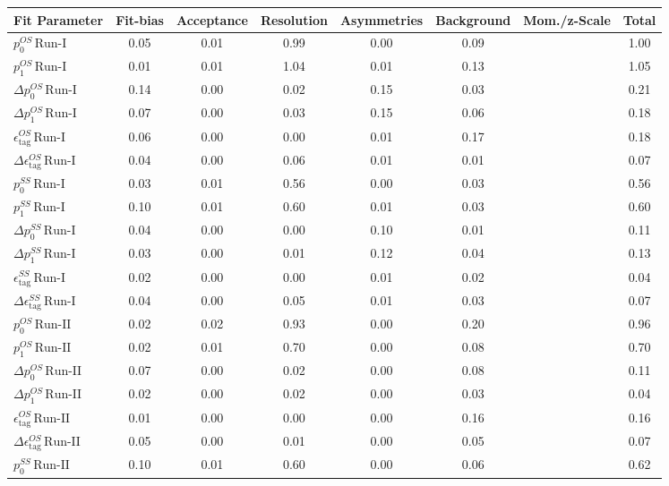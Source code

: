 \begin{tabular}{l  c  c  c  c  c  c  | c }
\hline
\hline
Fit Parameter & Fit-bias & Acceptance & Resolution & Asymmetries & Background & Mom./z-Scale &  Total  \\ 
\hline
$p_{0}^{OS} \, \text{Run-I}$ & 0.05 & 0.01 & 0.99 & 0.00 & 0.09 &  & 1.00 \\ 
$p_{1}^{OS} \, \text{Run-I}$ & 0.01 & 0.01 & 1.04 & 0.01 & 0.13 &  & 1.05 \\ 
$\Delta p_{0}^{OS} \, \text{Run-I}$ & 0.14 & 0.00 & 0.02 & 0.15 & 0.03 &  & 0.21 \\ 
$\Delta p_{1}^{OS} \, \text{Run-I}$ & 0.07 & 0.00 & 0.03 & 0.15 & 0.06 &  & 0.18 \\ 
$\epsilon_{\text{tag}}^{OS} \, \text{Run-I}$ & 0.06 & 0.00 & 0.00 & 0.01 & 0.17 &  & 0.18 \\ 
$\Delta \epsilon_{\text{tag}}^{OS} \, \text{Run-I}$ & 0.04 & 0.00 & 0.06 & 0.01 & 0.01 &  & 0.07 \\ 
$p_{0}^{SS} \, \text{Run-I}$ & 0.03 & 0.01 & 0.56 & 0.00 & 0.03 &  & 0.56 \\ 
$p_{1}^{SS} \, \text{Run-I}$ & 0.10 & 0.01 & 0.60 & 0.01 & 0.03 &  & 0.60 \\ 
$\Delta p_{0}^{SS} \, \text{Run-I}$ & 0.04 & 0.00 & 0.00 & 0.10 & 0.01 &  & 0.11 \\ 
$\Delta p_{1}^{SS} \, \text{Run-I}$ & 0.03 & 0.00 & 0.01 & 0.12 & 0.04 &  & 0.13 \\ 
$\epsilon_{\text{tag}}^{SS} \, \text{Run-I}$ & 0.02 & 0.00 & 0.00 & 0.01 & 0.02 &  & 0.04 \\ 
$\Delta \epsilon_{\text{tag}}^{SS} \, \text{Run-I}$ & 0.04 & 0.00 & 0.05 & 0.01 & 0.03 &  & 0.07 \\ 
$p_{0}^{OS} \, \text{Run-II}$ & 0.02 & 0.02 & 0.93 & 0.00 & 0.20 &  & 0.96 \\ 
$p_{1}^{OS} \, \text{Run-II}$ & 0.02 & 0.01 & 0.70 & 0.00 & 0.08 &  & 0.70 \\ 
$\Delta p_{0}^{OS} \, \text{Run-II}$ & 0.07 & 0.00 & 0.02 & 0.00 & 0.08 &  & 0.11 \\ 
$\Delta p_{1}^{OS} \, \text{Run-II}$ & 0.02 & 0.00 & 0.02 & 0.00 & 0.03 &  & 0.04 \\ 
$\epsilon_{\text{tag}}^{OS} \, \text{Run-II}$ & 0.01 & 0.00 & 0.00 & 0.00 & 0.16 &  & 0.16 \\ 
$\Delta \epsilon_{\text{tag}}^{OS} \, \text{Run-II}$ & 0.05 & 0.00 & 0.01 & 0.00 & 0.05 &  & 0.07 \\ 
$p_{0}^{SS} \, \text{Run-II}$ & 0.10 & 0.01 & 0.60 & 0.00 & 0.06 &  & 0.62 \\ 

\end{tabular}
